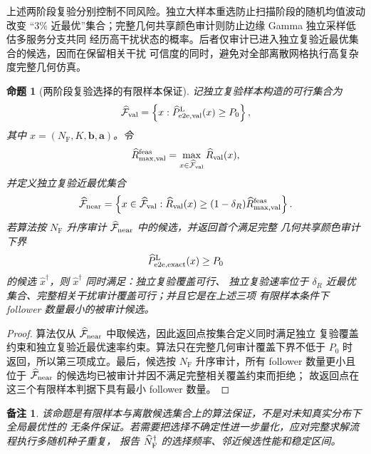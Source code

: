 \documentclass[UTF8,a4paper,11pt]{ctexart}
\newtheorem{proposition}{命题}[section]
\newtheorem{remark}{备注}[section]
\newcommand{\NF}{N_{\mathrm F}}
\newcommand{\bvec}{\bm b}
\newcommand{\avec}{\bm a}
\begin{document}
上述两阶段复验分别控制不同风险。独立大样本重选防止扫描阶段的随机均值波动改变
“3\% 近最优”集合；完整几何共享颜色审计则防止边缘 Gamma 独立采样低估多服务分支共同
经历高干扰状态的概率。后者仅审计已进入独立复验近最优集合的候选，因而在保留相关干扰
可信度的同时，避免对全部离散网格执行高复杂度完整几何仿真。

\begin{proposition}[两阶段复验选择的有限样本保证]
记独立复验样本构造的可行集合为
\begin{equation}
 \widehat{\mathcal F}_{\rm val}
 =
 \left\{
 x:\widehat P_{{\rm e2e,val}}^{\rm L}(x)\geq P_0
 \right\},
\end{equation}
其中 $x=(\NF,K,\bvec,\avec)$。令
\begin{equation}
 \widehat R_{\max,\rm val}^{\rm feas}
 =
 \max_{x\in\widehat{\mathcal F}_{\rm val}}
 \widehat R_{\rm val}(x),
\end{equation}
并定义独立复验近最优集合
\begin{equation}
 \widehat{\mathcal F}_{\rm near}
 =
 \left\{
 x\in\widehat{\mathcal F}_{\rm val}:
 \widehat R_{\rm val}(x)
 \geq
 (1-\delta_R)\widehat R_{\max,\rm val}^{\rm feas}
 \right\}.
\end{equation}
若算法按 $\NF$ 升序审计 $\widehat{\mathcal F}_{\rm near}$ 中的候选，并返回首个满足完整
几何共享颜色审计下界
\begin{equation}
 \widehat P_{{\rm e2e,exact}}^{\rm L}(x)\geq P_0
\end{equation}
的候选 $\widehat x^\dagger$，则 $\widehat x^\dagger$ 同时满足：独立复验覆盖可行、
独立复验速率位于 $\delta_R$ 近最优集合、完整相关干扰审计覆盖可行；并且它是在上述三项
有限样本条件下 follower 数量最小的被审计候选。
\end{proposition}

\begin{proof}
算法仅从 $\widehat{\mathcal F}_{\rm near}$ 中取候选，因此返回点按集合定义同时满足独立
复验覆盖约束和独立复验近最优速率约束。算法只在完整几何审计覆盖下界不低于 $P_0$ 时
返回，所以第三项成立。最后，候选按 $\NF$ 升序审计，所有 follower 数量更小且位于
$\widehat{\mathcal F}_{\rm near}$ 的候选均已被审计并因不满足完整相关覆盖约束而拒绝；
故返回点在这三个有限样本判据下具有最小 follower 数量。
\end{proof}

\begin{remark}
该命题是\emph{有限样本与离散候选集合上的算法保证}，不是对未知真实分布下全局最优性的
无条件保证。若需要把选择不确定性进一步量化，应对完整求解流程执行多随机种子重复，
报告 $\widehat N_{\rm F}^{\dagger}$ 的选择频率、邻近候选性能和稳定区间。
\end{remark}
\end{document}
